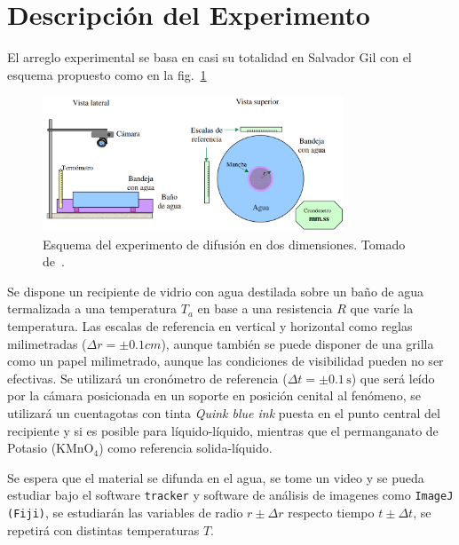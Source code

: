\documentclass{article}[13pt]
\begin{document}
\section*{Descripción del Experimento}
El arreglo experimental se basa en casi su totalidad en Salvador Gil con el esquema propuesto como en la fig.~\ref{fig:esquema_experimental}
\begin{figure}[htp]
    \centering
    \includegraphics[width=0.8\textwidth]{figs/esquema_refGil.png}
\caption{Esquema del experimento de difusión en dos dimensiones. Tomado de~\cite{gilExperimentosFisicaUsando2014}.}\label{fig:esquema_experimental}
\end{figure}
Se dispone un recipiente de vidrio con agua destilada sobre un baño de agua termalizada a una temperatura $T_a$ en base a una resistencia $R$ que varíe la temperatura. Las escalas de referencia en vertical y horizontal como reglas milimetradas ($\Delta r = \pm 0.1 cm$), aunque también se puede disponer de una grilla como un papel milimetrado, aunque las condiciones de visibilidad pueden no ser efectivas. Se utilizará un cronómetro de referencia ($\Delta t = \pm 0.1 \, \unit{\second}$) que será leído por la cámara posicionada en un soporte en posición cenital al fenómeno, se utilizará un cuentagotas con tinta  \textit{Quink blue ink} puesta en el punto central del recipiente y si es posible para líquido-líquido, mientras que el permanganato de Potasio (KMnO$_4$) como referencia solida-líquido.

Se espera que el material se difunda en el agua, se tome un video y se pueda estudiar bajo el software \texttt{tracker} y software de análisis de imagenes como \texttt{ImageJ (Fiji)}, se estudiarán las variables de radio $r\pm\Delta r$ respecto tiempo $t\pm\Delta t$, se repetirá con distintas temperaturas $T$.
\end{document}
